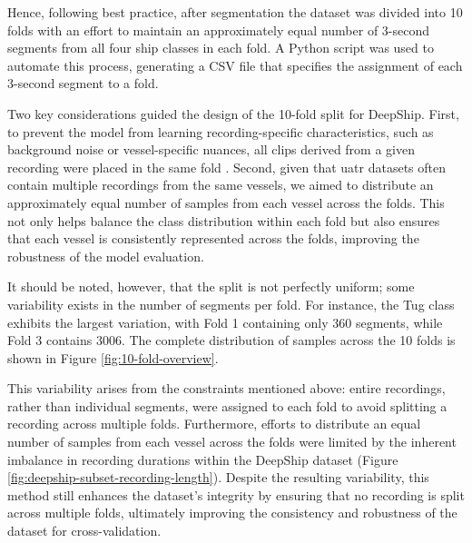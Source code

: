 Hence, following best practice, after segmentation the dataset was divided into 10 folds with an effort to maintain an approximately equal number of 3-second segments from all four ship classes in each fold. A Python script was used to automate this process, generating a CSV file that specifies the assignment of each 3-second segment to a fold.

Two key considerations guided the design of the 10-fold split for DeepShip. First, to prevent the model from learning recording-specific characteristics, such as background noise or vessel-specific nuances, all clips derived from a given recording were placed in the same fold \cite{chi_classifying_2022}. Second, given that \acrshort{uatr} datasets often contain multiple recordings from the same vessels, we aimed to distribute an approximately equal number of samples from each vessel across the folds. This not only helps balance the class distribution within each fold but also ensures that each vessel is consistently represented across the folds, improving the robustness of the model evaluation.

It should be noted, however, that the split is not perfectly uniform; some variability exists in the number of segments per fold. For instance, the Tug class exhibits the largest variation, with Fold 1 containing only 360 segments, while Fold 3 contains 3006. The complete distribution of samples across the 10 folds is shown in Figure \ref{fig:10-fold-overview}. 

This variability arises from the constraints mentioned above: entire recordings, rather than individual segments, were assigned to each fold to avoid splitting a recording across multiple folds. Furthermore, efforts to distribute an equal number of samples from each vessel across the folds were limited by the inherent imbalance in recording durations within the DeepShip dataset (Figure \ref{fig:deepship-subset-recording-length}). Despite the resulting variability, this method still enhances the dataset's integrity by ensuring that no recording is split across multiple folds, ultimately improving the consistency and robustness of the dataset for cross-validation.

